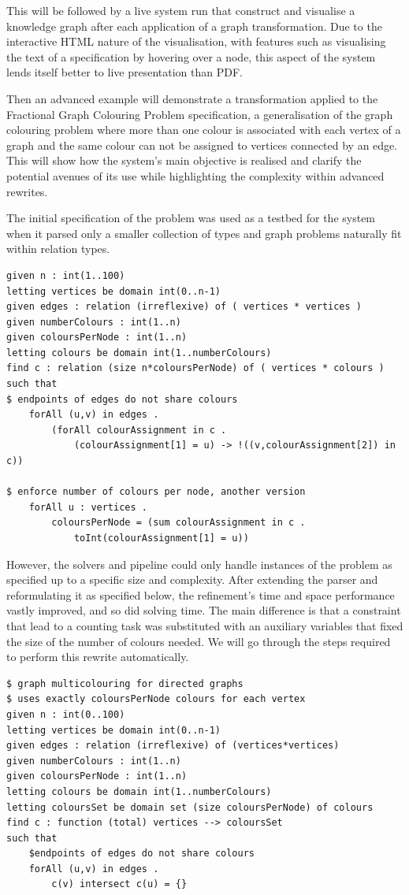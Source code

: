 This will be followed by a live system run that construct and visualise a knowledge graph after each application of a graph transformation. Due to the interactive HTML nature of the visualisation, with features such as visualising the text of a specification by hovering over a node, this aspect of the system lends itself better to live presentation than PDF.

Then an advanced example will demonstrate a transformation applied to the Fractional Graph Colouring Problem specification, a generalisation of the graph colouring problem where more than one colour is associated with each vertex of a graph and the same colour can not be assigned to vertices connected by an edge. This will show how the system's main objective is realised and clarify the potential avenues of its use while highlighting the complexity within advanced rewrites.

The initial specification of the problem was used as a testbed for the system when it parsed only a smaller collection of types and graph problems naturally fit within relation types.

\begin{lstlisting}
given n : int(1..100)
letting vertices be domain int(0..n-1)
given edges : relation (irreflexive) of ( vertices * vertices )
given numberColours : int(1..n)
given coloursPerNode : int(1..n)
letting colours be domain int(1..numberColours)
find c : relation (size n*coloursPerNode) of ( vertices * colours )
such that
$ endpoints of edges do not share colours
    forAll (u,v) in edges .
        (forAll colourAssignment in c .
            (colourAssignment[1] = u) -> !((v,colourAssignment[2]) in c))

$ enforce number of colours per node, another version
    forAll u : vertices .
        coloursPerNode = (sum colourAssignment in c .
            toInt(colourAssignment[1] = u))
\end{lstlisting}


However, the solvers and pipeline could only handle instances of the problem as specified up to a specific size and complexity. 
After extending the parser and reformulating it as specified below, the refinement's time and space performance vastly improved, and so did solving time.
The main difference is that a constraint that lead to a counting task was substituted with an auxiliary variables that fixed the size of the number of colours needed. We will go through the steps required to perform this rewrite automatically.

\begin{lstlisting}
$ graph multicolouring for directed graphs
$ uses exactly coloursPerNode colours for each vertex
given n : int(0..100)
letting vertices be domain int(0..n-1)
given edges : relation (irreflexive) of (vertices*vertices)
given numberColours : int(1..n)
given coloursPerNode : int(1..n)
letting colours be domain int(1..numberColours)
letting coloursSet be domain set (size coloursPerNode) of colours
find c : function (total) vertices --> coloursSet
such that
    $endpoints of edges do not share colours
    forAll (u,v) in edges .
        c(v) intersect c(u) = {}
\end{lstlisting}

